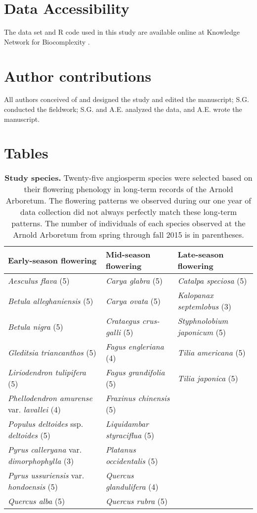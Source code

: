 \documentclass{article}
\begin{document}
\section*{Data Accessibility}
The data set and R code used in this study are available online at Knowledge Network for Biocomplexity \citep{gee2017}. 

\section*{Author contributions} All authors conceived of and designed the study and edited the manuscript; S.G. conducted the fieldwork; S.G. and A.E. analyzed the data, and A.E. wrote the manuscript.



\section* {Tables}
\begin{table}[p]
 \caption{\textbf{Study species.} Twenty-five angiosperm species were selected based on their flowering phenology in long-term records of the Arnold Arboretum. The flowering patterns we observed during our one year of data collection did not always perfectly match these long-term patterns. The number of individuals of each species observed at the Arnold Arboretum from spring through fall 2015 is in parentheses.}
\begin{footnotesize} 
 \begin{tabular}{| p{5.5cm} | p{5.5cm} | p{5.5cm} |}
 \hline
 \bf{Early-season flowering} & \bf{Mid-season flowering} & \bf{Late-season flowering} \\ \hline
 \textit{Aesculus flava} (5) & \textit{Carya glabra} (5) & \textit{Catalpa speciosa} (5) \\ 
 \textit{Betula alleghaniensis} (5) & \textit{Carya ovata} (5) & \textit{Kalopanax septemlobus} (3) \\ 
 \textit{Betula nigra} (5) & \textit{Crataegus crus-galli} (5) & \textit{Styphnolobium japonicum} (5) \\ 
\textit{Gleditsia triancanthos} (5) & \textit{Fagus engleriana} (4) & \textit{Tilia americana} (5) \\ 
\textit{Liriodendron tulipifera} (5) & \textit{Fagus grandifolia} (5) & \textit{Tilia japonica} (5) \\ 
\textit{Phellodendron amurense} var. \textit{lavallei} (4) & \textit{Fraxinus chinensis} (5) &\\ \textit{Populus deltoides} ssp. \textit{deltoides} (5) & \textit{Liquidambar styraciflua} (5) & \\ 
\textit{Pyrus calleryana} var. \textit{dimorphophylla} (3) & \textit{Platanus occidentalis} (5) & \\ 
\textit{Pyrus ussuriensis} var. \textit{hondoensis} (5) & \textit{Quercus glandulifera} (4) & \\ \textit{Quercus alba} (5) & \textit{Quercus rubra} (5) & \\ \hline
 \end{tabular} 
\end{footnotesize} 
 \end{table}
\end{document}
